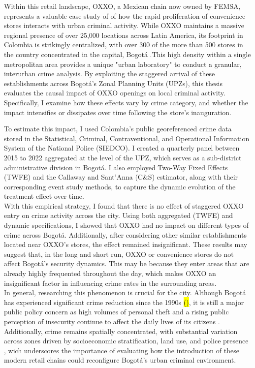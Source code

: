 \documentclass[12pt]{article}
\begin{document}
Within this retail landscape, OXXO, a Mexican chain now owned by FEMSA, represents a valuable case study of of how the rapid proliferation of convenience stores interacts with urban  criminal activity. While OXXO maintains a massive regional presence of over 25,000 locations across Latin America, its footprint in Colombia is strikingly centralized, with over 300 of the more than 500 stores in the country concentrated in the capital, Bogotá \parencite{godoy2025}.This high density within a single metropolitan area provides a unique "urban laboratory" to conduct a granular, interurban crime analysis. By exploiting the staggered arrival of these establishments across Bogotá’s Zonal Planning Units (UPZs), this thesis evaluates the causal impact of OXXO openings on local criminal activity. Specifically, I examine how these effects vary by crime category, and whether the impact intensifies or dissipates over time following the store's inauguration.

To estimate this impact, I used Colombia’s public georeferenced crime data stored in the Statistical, Criminal, Contraventional, and Operational Information System of the National Police (SIEDCO). I created a quarterly panel between 2015 to 2022 aggregated at the level of the UPZ, which serves as a sub-district administrative division in Bogotá. I also employed Two-Way Fixed Effects (TWFE) and the Callaway and Sant'Anna (C\&S) estimator, along with their corresponding event study methods, to capture the dynamic evolution of the treatment effect over time.\\

With this empirical strategy, I found that there is no effect of staggered OXXO entry on crime activity across the city. Using both aggregated (TWFE) and dynamic specifications, I showed that OXXO had no impact on different types of crime across Bogotá. Additionally, after considering other similar establishments located near OXXO’s stores, the effect remained insignificant. These results may suggest that, in the long and short run, OXXO or convenience stores do not affect Bogotá’s security dynamics. This may be because they enter areas that are already highly frequented throughout the day, which makes OXXO an insignificant factor in influencing crime rates in the surrounding areas.\\

In general, researching this phenomenon is crucial for the city. Although Bogotá has experienced significant crime reduction since the 1990s \hl{()}, it is still a major public policy concern as high volumes of personal theft and a rising public perception of insecurity continue to affect the daily lives of its citizens \parencite{CCB2026}. Additionally, crime remains spatially concentrated, with substantial variation across zones driven by socioeconomic stratification, land use, and police presence \parencite{Enriquez2014,GimenezSantana2018}, wich underscores the importance of evaluating how the introduction of these modern retail chains could reconfigure Bogotá’s urban criminal environment.\\
\end{document}
